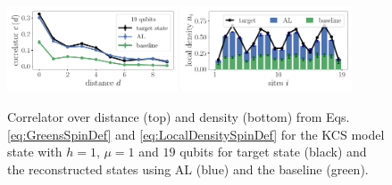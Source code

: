 \documentclass[pra,aps,showpacs,groupedaddress,superscriptaddress,twocolumn,toc=flat,biblatex,footinbib]{revtex4-1}
\begin{document}
\begin{figure}[t]
	\centering
   \includegraphics[width=0.45\textwidth]{Paper/Graphics/LGT_h=1_finite_mu_correlator_19_qubits.pdf}
   \includegraphics[width=0.45\textwidth]{Paper/Graphics/LGT_h=1_finite_mu_density_19_qubits.pdf}
	\caption[]{Correlator over distance (top) and density (bottom) from Eqs. \eqref{eq:GreensSpinDef} and \eqref{eq:LocalDensitySpinDef} for the KCS model state with $h=1$, $\mu=1$ and $19$ qubits for target state (black) and the reconstructed states using AL (blue) and the baseline (green).}
	\label{fig:LGT_h=1_2}
\end{figure}
\end{document}
